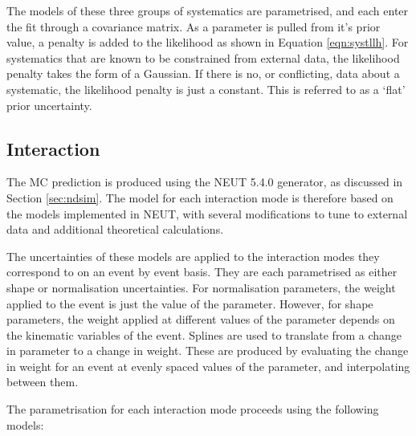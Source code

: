 The models of these three groups of systematics are parametrised, and each enter the fit through a covariance matrix. As a parameter is pulled from it's prior value, a penalty is added to the likelihood as shown in Equation \ref{eqn:systllh}. For systematics that are known to be constrained from external data, the likelihood penalty takes the form of a Gaussian. If there is no, or conflicting, data about a systematic, the likelihood penalty is just a constant. This is referred to as a `flat' prior uncertainty.

\subsection{Interaction}\label{sec:xsec}

The MC prediction is produced using the NEUT 5.4.0 generator\cite{neut}, as discussed in Section \ref{sec:ndsim}. The model for each interaction mode is therefore based on the models implemented in NEUT, with several modifications to tune to external data and additional theoretical calculations.

The uncertainties of these models are applied to the interaction modes they correspond to on an event by event basis. They are each parametrised as either shape or normalisation uncertainties. For normalisation parameters, the weight applied to the event is just the value of the parameter. However, for shape parameters, the weight applied at different values of the parameter depends on the kinematic variables of the event. Splines are used to translate from a change in parameter to a change in weight. These are produced by evaluating the change in weight for an event at evenly spaced values of the parameter, and interpolating between them. 

The parametrisation for each interaction mode proceeds using the following models:

